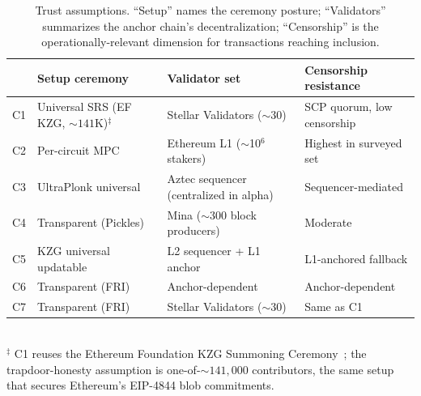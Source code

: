 \begin{table}[t]
  \centering
  \caption{Trust assumptions. ``Setup'' names the ceremony posture;
    ``Validators'' summarizes the anchor chain's decentralization;
    ``Censorship'' is the operationally-relevant dimension for
    transactions reaching inclusion.}
  \label{tab:trust}
  \begin{tabular}{llll}
    \toprule
    & Setup ceremony           & Validator set                & Censorship resistance     \\
    \midrule
    C1 & Universal SRS (EF KZG, ${\sim}141$K)$^{\ddagger}$ & Stellar Validators ($\sim$30) & SCP quorum, low censorship      \\
    C2 & Per-circuit MPC          & Ethereum L1 ($\sim$10$^6$ stakers) & Highest in surveyed set       \\
    C3 & UltraPlonk universal     & Aztec sequencer (centralized in alpha) & Sequencer-mediated      \\
    C4 & Transparent (Pickles)    & Mina ($\sim$300 block producers) & Moderate                      \\
    C5 & KZG universal updatable  & L2 sequencer + L1 anchor   & L1-anchored fallback              \\
    C6 & Transparent (FRI)        & Anchor-dependent          & Anchor-dependent                  \\
    C7 & Transparent (FRI)        & Stellar Validators ($\sim$30) & Same as C1                       \\
    \bottomrule
  \end{tabular}
  \\[0.5em]
  \footnotesize
  $^{\ddagger}$ C1 reuses the Ethereum Foundation KZG Summoning
  Ceremony~\cite{eth-kzg-ceremony}; the trapdoor-honesty assumption
  is one-of-${\sim}141{,}000$ contributors, the same setup that
  secures Ethereum's EIP-4844 blob commitments.
\end{table}
